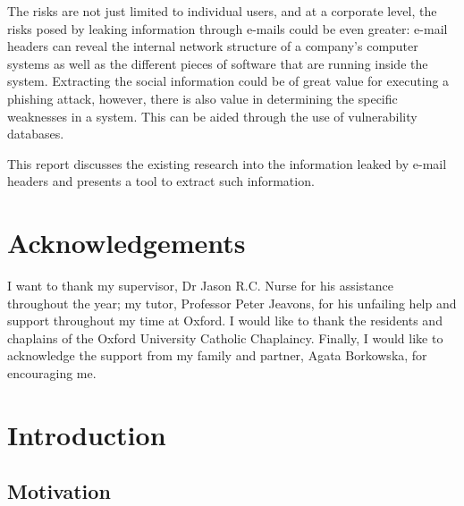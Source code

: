 \documentclass[a4paper,DIV=12,BCOR=7mm,abstract=yes,twoside,10pt]{scrreprt}
\begin{document}
The risks are not just limited to individual users, and at a corporate
level, the risks posed by leaking information through e-mails could be even
greater: e-mail headers can reveal the internal network structure of a
company's computer systems as well as the different pieces of software that
are running inside the system.  Extracting the social information could be
of great value for executing a phishing attack, however, there is also value
in determining the specific weaknesses in a system.  This can be aided
through the use of vulnerability databases.

This report discusses the existing research into the information leaked by
e-mail headers and presents a tool to extract such information.

\chapter*{Acknowledgements}

I want to thank my supervisor, Dr Jason R.C. Nurse for his assistance
throughout the year; my tutor, Professor Peter Jeavons, for his unfailing
help and support throughout my time at Oxford.  I would like to thank the
residents and chaplains of the Oxford University Catholic Chaplaincy.
Finally, I would like to acknowledge the support from my family and
partner, Agata Borkowska, for encouraging me.

\tableofcontents 
\let\LaTeXStandardClearpage\clearpage
\let\clearpage\relax  %

\listoftables \listoffigures \listofalgorithms

\let\clearpage\LaTeXStandardClearpage %


\chapter{Introduction}
\setcounter{page}{1}

\section{Motivation}
\end{document}
